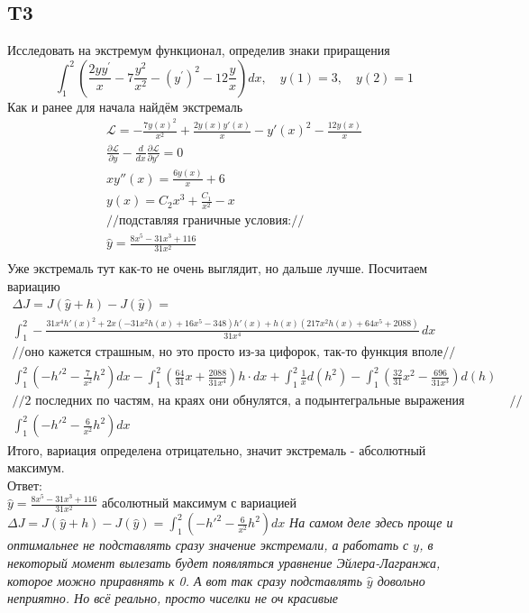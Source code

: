 \documentclass{article}
\newcommand{\Lagr}{\mathcal{L}}
\begin{document}
\subsection{T3}
Исследовать на экстремум функционал, определив знаки приращения
\begin{equation}
    \int_{1}^{2}\left(\frac{2 y y^{\prime}}{x}-7 \frac{y^{2}}{x^{2}}-\left(y^{\prime}\right)^{2}-12 \frac{y}{x}\right) d x, \quad y(1)=3, \quad y(2)=1
\end{equation}
Как и ранее для начала найдём экстремаль
\begin{gather*}
    \Lagr =-\frac{7 y(x)^2}{x^2}+\frac{2 y(x) y'(x)}{x}-y'(x)^2-\frac{12 y(x)}{x}\\
    \frac{\partial \Lagr}{\partial y}  - \frac{d }{d x} \frac{\partial \Lagr}{\partial y'} =0   \\
    x y''(x)=\frac{6 y(x)}{x}+6\\
    y(x) = C_2 x^3+\frac{C_1}{x^2}-x\\
    //\text{подставляя граничные условия:}//\\
    \hat y=\frac{8 x^5-31 x^3+116}{31 x^2}\\
\end{gather*}
Уже экстремаль тут как-то не очень выглядит, но дальше лучше. Посчитаем вариацию
\begin{gather*}
    \Delta J = J(\hat y + h) - J(\hat y) = \\
    \int_1^2 -\frac{31 x^4 h'(x)^2+2 x \left(-31 x^2 h(x)+16 x^5-348\right) h'(x)+h(x) \left(217 x^2 h(x)+64 x^5+2088\right)}{31 x^4} \, dx\\
    //\text{оно кажется страшным, но это просто из-за цифорок, так-то функция вполе}//\\
    \int_1^2 \left( -h'^2 -\frac{7}{x^2}h^2 \right)dx -
    \int_1^2 \left(\frac{64}{31}x + \frac{2088}{31x^4} \right)h \cdot dx +
    \int_1^2 \frac{1}{x} d(h^2) -
    \int_1^2 \left( \frac{32}{31} x^2 -\frac{696}{31x^3}\right)d(h)\\
    //\text{2 последних по частям, на краях они обнулятся, а подынтегральные выражения сократятся}//\\
    \int_1^2 \left(-h'^2  - \frac{6}{x^2}h^2 \right)dx
\end{gather*}
Итого, вариация определена отрицательно, значит экстремаль - абсолютный максимум.\\
Ответ: \\
$\hat y = \frac{8 x^5-31 x^3+116}{31 x^2}$  абсолютный максимум с вариацией $\Delta J = J(\hat y + h) - J(\hat y) =\int_1^2 \left(-h'^2  - \frac{6}{x^2}h^2\right)dx$
 \textcolor[rgb]{0.480469,0.566406,0.480469}{\textit{На самом деле здесь проще и оптимальнее не подставлять сразу значение экстремали, а работать с $y$, в некоторый момент вылезать будет появляться уравнение Эйлера-Лагранжа, которое можно приравнять к 0. А вот так сразу подставлять $\hat y$ довольно неприятно. Но всё реально, просто чиселки не оч красивые}}                                               
\end{document}
